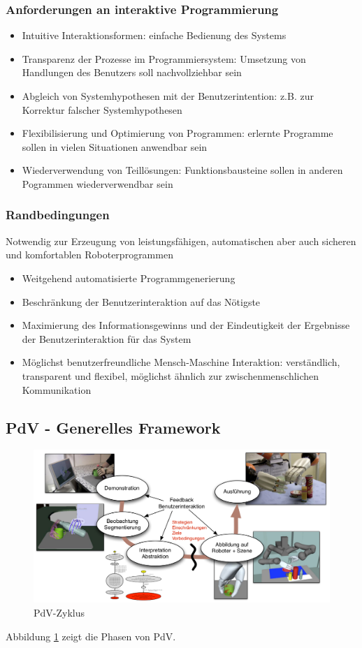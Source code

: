 \subsubsection*{Anforderungen an interaktive Programmierung}
\begin{itemize}
\item[1.]Intuitive Interaktionsformen: einfache Bedienung des Systems
\item[2.]Transparenz der Prozesse im Programmiersystem: Umsetzung von Handlungen des Benutzers soll nachvollziehbar sein
\item[3.]Abgleich von Systemhypothesen mit der Benutzerintention: z.B. zur Korrektur falscher Systemhypothesen
\item[4.]Flexibilisierung und Optimierung von Programmen: erlernte Programme sollen in vielen Situationen anwendbar sein
\item[5.]Wiederverwendung von Teillösungen: Funktionsbausteine sollen in anderen Pogrammen wiederverwendbar sein
\end{itemize}

\subsubsection*{Randbedingungen}
Notwendig zur Erzeugung von leistungsfähigen, automatischen aber auch sicheren und komfortablen Roboterprogrammen
\begin{itemize}
\item[1.]Weitgehend automatisierte Programmgenerierung
\item[2.]Beschränkung der Benutzerinteraktion auf das Nötigste
\item[3.]Maximierung des Informationsgewinns und der Eindeutigkeit der Ergebnisse der Benutzerinteraktion für das System
\item[4.]Möglichst benutzerfreundliche Mensch-Maschine Interaktion: verständlich, transparent und flexibel, möglichst ähnlich zur zwischenmenschlichen Kommunikation
\end{itemize}

\subsection{PdV - Generelles Framework}
\begin{figure}[ht]\centering 
\includegraphics[width=0.6\linewidth]{figures/ch03_zyklus.png}
\caption{PdV-Zyklus}
\label{fig:ch03_zykl}
\end{figure}
Abbildung  \ref{fig:ch03_zykl} zeigt die Phasen von PdV.

